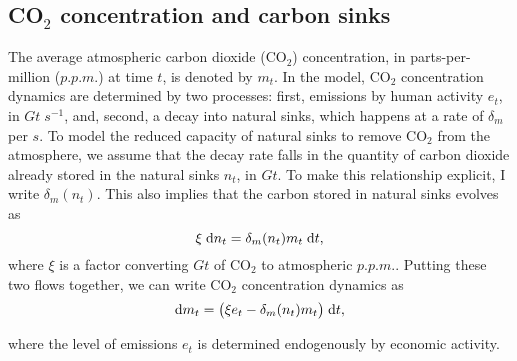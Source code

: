 \documentclass[../../main.tex]{subfiles}
\begin{document}
\subsection[Carbon Dioxide concentration]{CO$_2$ concentration and carbon sinks}

The average atmospheric carbon dioxide (CO$_2$) concentration, in parts-per-million ($\unit{p.p.m.}$) at time $t$, is denoted by $m_t$. In the model, CO$_2$ concentration dynamics are determined by two processes: first, emissions by human activity $e_t$, in $\unit{Gt} \; \unit{s}^{-1}$, and, second, a decay into natural sinks, which happens at a rate of $\delta_m$ per $\unit{s}$. To model the reduced capacity of natural sinks to remove CO$_2$ from the atmosphere, we assume that the decay rate falls in the quantity of carbon dioxide already stored in the natural sinks $n_t$, in $\unit{Gt}$. To make this relationship explicit, I write $\delta_m(n_t)$. This also implies that the carbon stored in natural sinks evolves as \begin{equation}
    \xi \; \mathrm{d}n_t = \delta_m(n_t) m_t \; \mathrm{d}t,
\end{equation} where $\xi$ is a factor converting $\unit{Gt}$ of CO$_2$ to atmospheric $\unit{p.p.m.}$. Putting these two flows together, we can write CO$_2$ concentration dynamics as \begin{equation} \label{eq:dynamics:m:emissions}
    \mathrm{d}m_t = \big(\xi e_t - \delta_m(n_t) m_t \big) \; \mathrm{d}t,
\end{equation}

where the level of emissions $e_t$ is determined endogenously by economic activity. 
\end{document}
